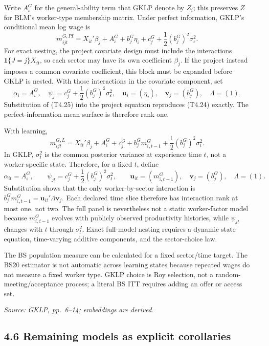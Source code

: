 \documentclass[11pt]{article}
\begin{document}
Write \(A_i^G\) for the general-ability term that GKLP denote by \(Z_i\);
this preserves \(Z\) for BLM's worker-type membership matrix.
Under perfect information, GKLP's conditional mean log wage is
\[
m_{ijt}^{G,PI}
=
X_{it}'\beta_j
+A_i^G
+b_j^G\eta_i
+c_j^G
+\frac12(b_j^G)^2\sigma_\varepsilon^2.
\tag{T4.24}
\]
For exact nesting, the project covariate design must include the interactions
\(\mathbf{1}\{J=j\}X_{it}\), so each sector may have its own coefficient
\(\beta_j\).  If the project instead imposes a common covariate coefficient,
this block must be expanded before GKLP is nested.  With those interactions
in the covariate component, set
\[
\alpha_i=A_i^G,
\quad
\psi_j=c_j^G+\frac12(b_j^G)^2\sigma_\varepsilon^2,
\quad
\mathbf u_i=(\eta_i),
\quad
\mathbf v_j=(b_j^G),
\quad
\Lambda=(1).
\tag{T4.25}
\]
Substitution of (T4.25) into the project equation reproduces (T4.24)
exactly.  The perfect-information mean surface is therefore rank one.

With learning,
\[
m_{ijt}^{G,L}
=
X_{it}'\beta_j+A_i^G+c_j^G
+b_j^Gm_{i,t-1}^G
+\frac12(b_j^G)^2\sigma_t^2.
\tag{T4.26}
\]
In GKLP, \(\sigma_t^2\) is the common posterior variance at experience time
\(t\), not a worker-specific state.  Therefore, for a fixed \(t\), define
\[
\alpha_{it}=A_i^G,
\qquad
\psi_{jt}=c_j^G+\frac12(b_j^G)^2\sigma_t^2,
\qquad
\mathbf u_{it}=(m_{i,t-1}^G),
\quad
\mathbf v_j=(b_j^G),
\quad
\Lambda=(1).
\tag{T4.27}
\]
Substitution shows that the only worker-by-sector interaction is
\(b_j^Gm_{i,t-1}^G=\mathbf u_{it}'\Lambda\mathbf v_j\).  Each declared
time slice therefore has interaction rank at most one, not two.  The full
panel is nevertheless not a static worker-factor model because
\(m_{i,t-1}^G\) evolves with publicly observed productivity histories, while
\(\psi_{jt}\) changes with \(t\) through \(\sigma_t^2\).  Exact full-model
nesting requires a dynamic state equation, time-varying additive components,
and the sector-choice law.

The BS population measure can be calculated for a fixed sector/time target.
The BS20 estimator is not automatic across learning states because repeated
wages do not measure a fixed worker type.  GKLP choice is Roy selection, not
a random-meeting/acceptance process; a literal BS ITT requires adding an offer
or access set.

\textit{Source: GKLP, pp.\ 6--14; embeddings are derived.}

\subsection{4.6 Remaining models as explicit corollaries}
\end{document}
